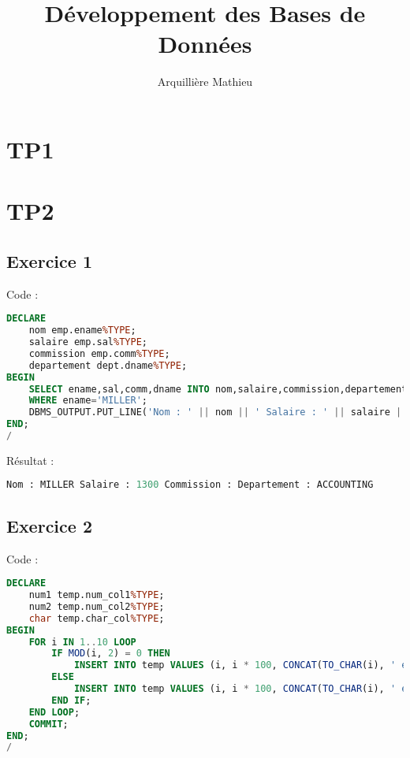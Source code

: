 \documentclass{article}
\title{Développement des Bases de Données}
\author{Arquillière Mathieu}
\begin{document}
\begin{titlepage}
  \maketitle
\end{titlepage}

\newpage

\section{TP1}

\section{TP2}

\subsection{Exercice 1}
Code :
\begin{lstlisting}[language=SQL,
    morekeywords={DECLARE, LOOP, TYPE, FOR, IF, IS, OPEN, FETCH, DBMS_OUTPUT, PUT_LINE}]
DECLARE
    nom emp.ename%TYPE;
    salaire emp.sal%TYPE;
    commission emp.comm%TYPE;
    departement dept.dname%TYPE;
BEGIN 
    SELECT ename,sal,comm,dname INTO nom,salaire,commission,departement FROM Emp NATURAL JOIN Dept
    WHERE ename='MILLER';
    DBMS_OUTPUT.PUT_LINE('Nom : ' || nom || ' Salaire : ' || salaire || ' Commission : ' || commission || 'Departement : ' || departement);
END;
/
\end{lstlisting}

Résultat :
\begin{lstlisting}[language=SQL,
    morekeywords={DECLARE, LOOP, TYPE, FOR, IF, IS, OPEN, FETCH, DBMS_OUTPUT, PUT_LINE}]
Nom : MILLER Salaire : 1300 Commission : Departement : ACCOUNTING
\end{lstlisting}

\subsection{Exercice 2}
Code :
\begin{lstlisting}[language=SQL,
    deletekeywords={char},
    morekeywords={DECLARE, LOOP, TYPE, FOR, IF, IS, OPEN, FETCH, DBMS_OUTPUT, PUT_LINE}]
DECLARE
    num1 temp.num_col1%TYPE;
    num2 temp.num_col2%TYPE;
    char temp.char_col%TYPE;
BEGIN
	FOR i IN 1..10 LOOP
		IF MOD(i, 2) = 0 THEN
			INSERT INTO temp VALUES (i, i * 100, CONCAT(TO_CHAR(i), ' est pair'));
		ELSE
			INSERT INTO temp VALUES (i, i * 100, CONCAT(TO_CHAR(i), ' est impair'));
		END IF;
	END LOOP;
	COMMIT;
END;
/
\end{lstlisting}
\end{document}
